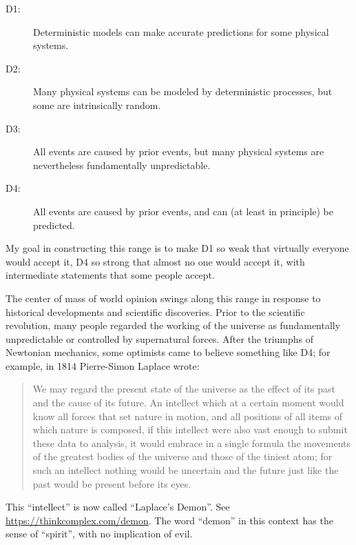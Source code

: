 \documentclass[12pt]{book}
\theoremstyle{exercise}
\begin{document}

\begin{description}

\item[D1:] Deterministic models can make accurate predictions
for some physical systems.

\item[D2:] Many physical systems can be modeled by deterministic
processes, but some are intrinsically random.

\item[D3:] All events are caused by prior events, but many
physical systems are nevertheless fundamentally unpredictable.

\item[D4:] All events are caused by prior events, and can (at
least in principle) be predicted.


\end{description}

My goal in constructing this range is to make D1 so weak that
virtually everyone would accept it, D4 so strong that almost no one
would accept it, with intermediate statements that some people accept.

The center of mass of world opinion swings along this range in
response to historical developments and scientific discoveries.  Prior
to the scientific revolution, many people regarded the working of the
universe as fundamentally unpredictable or controlled by supernatural
forces.  After the triumphs of Newtonian mechanics, some optimists
came to believe something like D4; for example, in 1814 Pierre-Simon
Laplace wrote:


\begin{quote}
We may regard the present state of the universe as the effect of its
past and the cause of its future. An intellect which at a certain
moment would know all forces that set nature in motion, and all
positions of all items of which nature is composed, if this intellect
were also vast enough to submit these data to analysis, it would
embrace in a single formula the movements of the greatest bodies of
the universe and those of the tiniest atom; for such an intellect
nothing would be uncertain and the future just like the past would be
present before its eyes.
\end{quote}

This ``intellect'' is now called ``Laplace's Demon''.
See \url{https://thinkcomplex.com/demon}.  The word
``demon'' in this context has the sense of ``spirit'', with no
implication of evil.
\end{document}
